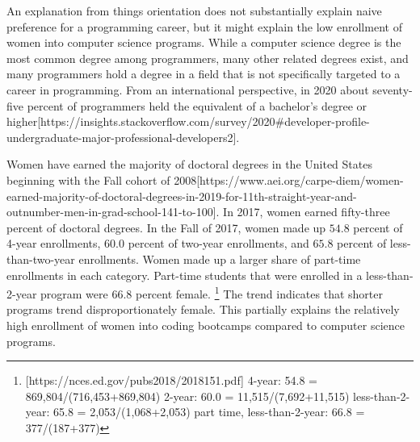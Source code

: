 \documentclass[review]{elsarticle}
\begin{document}
An explanation from things orientation does not substantially explain
naive preference for a programming career,
but it might explain the low enrollment of women into computer science programs.
While a computer science degree is the most common degree among programmers,
many other related degrees exist,
and many programmers hold a degree in a field that is not specifically targeted to a career in programming.
From an international perspective,
in 2020 about seventy-five percent of programmers held the equivalent of a bachelor's degree or higher[https://insights.stackoverflow.com/survey/2020#developer-profile-undergraduate-major-professional-developers2].


Women have earned the majority of doctoral degrees in the United States
beginning with the Fall cohort of 2008[https://www.aei.org/carpe-diem/women-earned-majority-of-doctoral-degrees-in-2019-for-11th-straight-year-and-outnumber-men-in-grad-school-141-to-100].
In 2017, women earned fifty-three percent of doctoral degrees.
In the Fall of 2017, women made up $54.8$ percent of 4-year enrollments,
$60.0$ percent of two-year enrollments,
and $65.8$ percent of less-than-two-year enrollments.
Women made up a larger share of part-time enrollments in each category.
Part-time students that were enrolled in a less-than-2-year program
were $66.8$ percent female.
\footnote{
    [https://nces.ed.gov/pubs2018/2018151.pdf]
    4-year: 54.8 = 869,804/(716,453+869,804)
    2-year: 60.0 = 11,515/(7,692+11,515)
    less-than-2-year: 65.8 = 2,053/(1,068+2,053)
    part time, less-than-2-year: 66.8 = 377/(187+377)
}
The trend indicates that shorter programs trend disproportionately female.
This partially explains the relatively high enrollment of women into
coding bootcamps compared to computer science programs.

\end{document}
